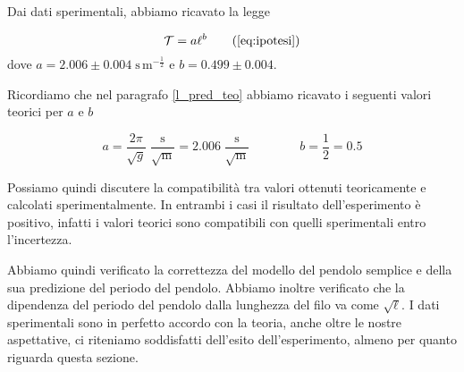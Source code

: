 Dai dati sperimentali, abbiamo ricavato la legge

\begin{equation}
    \mathcal{T} = a\ell^b
    \tag{\ref{eq:ipotesi}}
\end{equation}
%
dove $a = 2.006 \pm 0.004 \; \text{s}\,\text{m}^{-\frac{1}{2}}$ e $b = 0.499 \pm 0.004$.

Ricordiamo che nel paragrafo \ref{l_pred_teo} abbiamo ricavato i seguenti valori teorici per $a$ e $b$

\begin{equation}
    a = \frac{2\pi}{\sqrt{g}} \; \frac{\text{s}}{\sqrt{\text{m}}} = 2.006 \; \frac{\text{s}}{\sqrt{\text{m}}} \qquad \qquad b = \frac{1}{2} = 0.5
\end{equation}

Possiamo quindi discutere la compatibilità tra valori ottenuti teoricamente e calcolati sperimentalmente.
In entrambi i casi il risultato dell'esperimento è positivo, infatti i valori teorici sono compatibili
con quelli sperimentali entro l'incertezza.

Abbiamo quindi verificato la correttezza del modello del pendolo semplice e della sua predizione del periodo
del pendolo. Abbiamo inoltre verificato che la dipendenza del periodo del pendolo dalla lunghezza del filo
va come $\sqrt{\ell}$. I dati sperimentali sono in perfetto accordo con la teoria, anche oltre le nostre aspettative,
ci riteniamo soddisfatti dell'esito dell'esperimento, almeno per quanto riguarda questa sezione.
